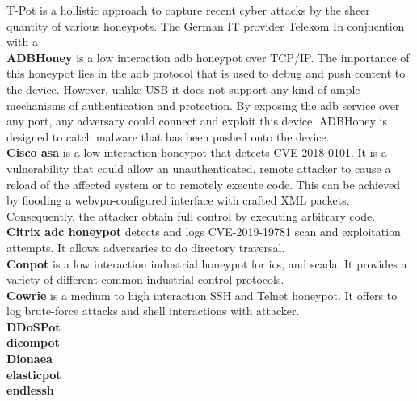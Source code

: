 T-Pot is a hollistic approach to capture recent cyber attacks by the sheer quantity of various honeypots.
The German IT provider Telekom  
In conjucntion with a \\

\textbf{ADBHoney} \cite{adbhoney2021} is a low interaction \ac{adb} honeypot over TCP/IP.
The importance of this honeypot lies in the \ac{adb} protocol that is used to debug and push content to the device.
However, unlike USB it does not support any kind of ample mechanisms of authentication and protection.
By exposing the \ac{adb} service over any port, any adversary could connect and exploit this device.
ADBHoney is designed to catch malware that has been pushed onto the device.\\

\textbf{Cisco \ac{asa}} \cite{cymmetria2018} is a low interaction honeypot that detects CVE-2018-0101.
It is a vulnerability that could allow an unauthenticated, remote attacker to cause a reload of the affected system or to remotely execute code.
This can be achieved by flooding a webvpn-configured interface with crafted XML packets.
Consequently, the attacker obtain full control by executing arbitrary code.\\

\textbf{Citrix \ac{adc} honeypot} \cite{citrixhoneypot2020} detects and logs CVE-2019-19781 scan and exploitation attempts.
It allows adversaries to do directory traversal.\\

\textbf{Conpot} \cite{conpot2021} is a low interaction industrial honeypot for \ac{ics}, and \ac{scada}.
It provides a variety of different common industrial control protocols.\\

\textbf{Cowrie} \cite{cowire2021} is a medium to high interaction SSH and Telnet honeypot.
It offers to log brute-force attacks and shell interactions with attacker.\\

\textbf{DDoSPot} \cite{ddosspot2021}\\

\textbf{dicompot} \cite{dicompot2021}\\

\textbf{Dionaea} \cite{dionaea2021}\\

\textbf{elasticpot} \cite{elasticpot2021}\\

\textbf{endlessh} \cite{endlessh2021}\\

